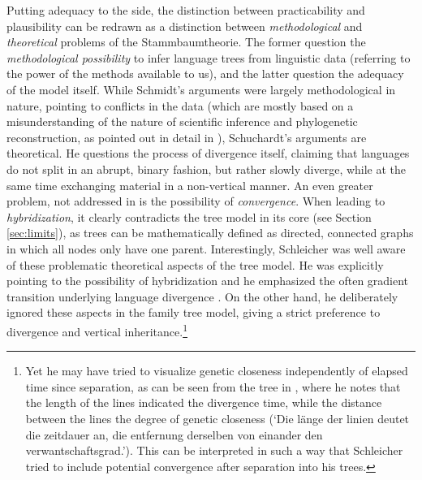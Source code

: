 \documentclass[svgnames,12pt]{scrartcl}
\begin{document}
{Putting adequacy to the side, the distinction between practicability and plausibility can be redrawn
as a distinction between \emph{methodological} and \emph{theoretical} problems of the
Stammbaumtheorie. The former question the \emph{methodological possibility} to infer language trees
from linguistic data (referring to the power of the methods available to us), and the latter
question the adequacy of the model itself. While Schmidt's arguments were largely methodological in
nature, pointing to conflicts in the data (which are mostly based on a misunderstanding of the
nature of scientific inference and phylogenetic reconstruction, as pointed out in detail in
\citealt{Geisler2013}), Schuchardt's arguments are theoretical. He questions the process of
divergence itself, claiming that languages do not split in an abrupt, binary fashion, but rather
slowly diverge, while at the same time exchanging material in a non-vertical manner. An even greater
problem, not addressed in \citet{Schuchardt1870} is the possibility of \emph{convergence}. When
leading to \emph{hybridization}, it clearly contradicts the tree model in its core (see Section
\ref{sec:limits}), as trees can be
mathematically defined as directed, connected graphs in which all nodes only have one parent.
Interestingly, Schleicher was well aware of these problematic theoretical aspects of the tree model. He was explicitly pointing to the possibility of hybridization 
\citep{Schleicher1848} and he emphasized the often gradient transition underlying language
divergence \citep[21]{Schleicher1863}.
On the other hand, he deliberately ignored these aspects in the family
tree model, giving a strict preference to divergence and vertical inheritance.\footnote{Yet he may have tried to visualize genetic closeness
independently of elapsed time since separation, as can be seen from the tree in
\citet[7]{Schleicher1861}, where he notes that the length of the lines indicated the divergence
time, while the distance between the lines the degree of genetic closeness (`{Die länge der linien
deutet die zeitdauer an, die entfernung derselben von einander den verwantschaftsgrad.}'). This
can be interpreted in such a way that Schleicher tried to include potential convergence after
separation into his trees.}
 
}
\end{document}
